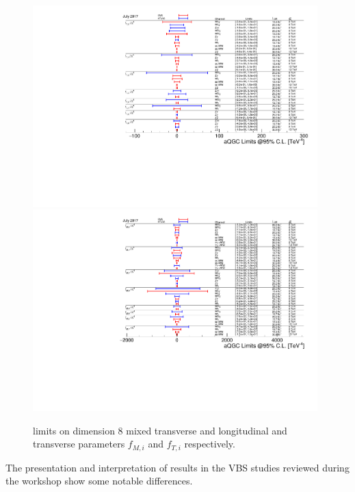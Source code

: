 \begin{figure}[h!]
    \begin{center}
    \includegraphics[width=11cm,scale=1]{figures/aQGC_ft}
    \includegraphics[width=11cm,scale=1]{figures/aQGC_fm-2}
     \end{center}
    \caption{limits on dimension 8 mixed transverse and longitudinal and transverse parameters $f_{M,i}$ and $f_{T,i}$ respectively.}
    \label{fig:EFT}
\end{figure}


The presentation and interpretation of results in the VBS studies reviewed during the workshop show some notable differences.



